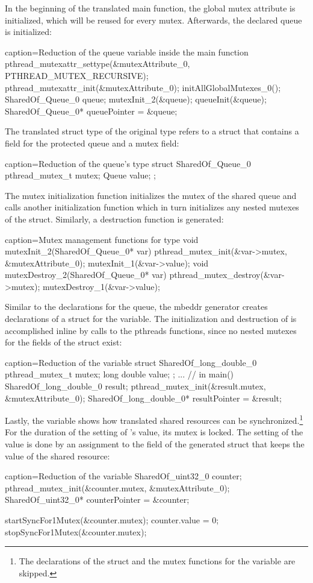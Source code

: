In the beginning of the translated main function, the global mutex attribute is initialized, which will be reused for every mutex. Afterwards, the declared queue is initialized:
\begin{ccode}{caption=Reduction of the queue variable inside the main function}
pthread_mutexattr_settype(&mutexAttribute_0, PTHREAD_MUTEX_RECURSIVE); 
pthread_mutexattr_init(&mutexAttribute_0); 
initAllGlobalMutexes_0(); 
SharedOf_Queue_0 queue; 
mutexInit_2(&queue); 
queueInit(&queue); 
SharedOf_Queue_0* queuePointer = &queue;
\end{ccode}
The translated struct type  of the original type  refers to a struct that contains a field for the protected queue and a mutex field:
\begin{ccode}{caption=Reduction of the queue's type}
struct SharedOf_Queue_0 { 
  pthread_mutex_t mutex; 
  Queue value; 
};
\end{ccode}
The mutex initialization function  initializes the mutex of the shared queue and calls another initialization function which in turn initializes any nested mutexes of the  struct. Similarly, a destruction function is generated:
\begin{ccode}{caption=Mutex management functions for type }
void mutexInit_2(SharedOf_Queue_0* var) { 
  pthread_mutex_init(&var->mutex, &mutexAttribute_0); 
  mutexInit_1(&var->value); 
}
void mutexDestroy_2(SharedOf_Queue_0* var) { 
  pthread_mutex_destroy(&var->mutex);
  mutexDestroy_1(&var->value); 
}      
\end{ccode}
Similar to the declarations for the queue, the mbeddr generator creates declarations of a struct for the  variable. The initialization and destruction of  is accomplished inline by calls to the pthreads functions, since no nested mutexes for the fields of the struct exist:
\begin{ccode}{caption=Reduction of the  variable}
struct SharedOf_long_double_0 { 
  pthread_mutex_t mutex; 
  long double value; 
};
... // in main()
SharedOf_long_double_0 result; 
pthread_mutex_init(&result.mutex, &mutexAttribute_0); 
SharedOf_long_double_0* resultPointer = &result;
\end{ccode}
Lastly, the  variable shows how translated shared resources can be synchronized.\footnote{The declarations of the struct and the mutex functions for the  variable are skipped.} For the duration of the setting of 's value, its mutex is locked. The setting of the value is done by an assignment to the  field of the generated struct that keeps the value of the shared resource:
\begin{ccode}{caption=Reduction of the  variable}
SharedOf_uint32_0 counter; 
pthread_mutex_init(&counter.mutex, &mutexAttribute_0); 
SharedOf_uint32_0* counterPointer = &counter;

startSyncFor1Mutex(&counter.mutex); 
{ counter.value = 0; } 
stopSyncFor1Mutex(&counter.mutex);
\end{ccode}

